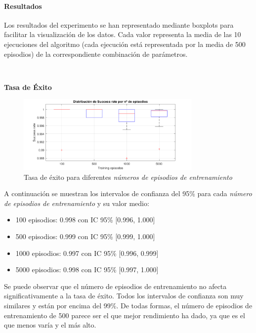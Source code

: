 \newpage
\paragraph{Resultados}

Los resultados del experimento se han representado mediante boxplots para facilitar la visualización de los datos. Cada valor representa la media de las 10 ejecuciones del algoritmo (cada ejecución está representada por la media de 500 episodios) de la correspondiente combinación de parámetros. 

\

\textbf{Tasa de Éxito}

\begin{figure}[H]
    \centering
    \includegraphics[width=0.8\textwidth]{../../experiments/directEstimation/experiment-2/results/success.png}
    \caption{Tasa de éxito para diferentes \textit{números de episodios de entrenamiento}}
    \label{fig:directEstimation2-success}
\end{figure}

A continuación se muestran los intervalos de confianza del 95\% para cada \textit{número de episodios de entrenamiento} y su valor medio:
\begin{itemize}
    \item 100 episodios: 0.998 con IC 95\% [0.996,  1.000]
    \item 500 episodios: 0.999 con IC 95\% [0.999,  1.000]
    \item 1000 episodios: 0.997 con IC 95\% [0.996,  0.999]
    \item 5000 episodios: 0.998 con IC 95\% [0.997,  1.000]
\end{itemize}

Se puede observar que el número de episodios de entrenamiento no afecta significativamente a la tasa de éxito. Todos los intervalos de confianza son muy similares y están por encima del 99\%. De todas formas, el número de episodios de entrenamiento de 500 parece ser el que mejor rendimiento ha dado, ya que es el que menos varía y el más alto.

